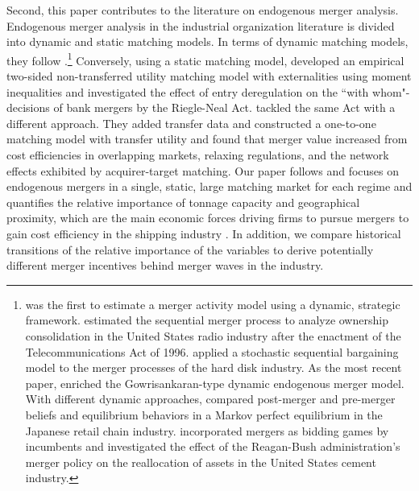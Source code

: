 \documentclass[10pt]{article}
\begin{document}
Second, this paper contributes to the literature on endogenous merger analysis. 
Endogenous merger analysis in the industrial organization literature is divided into dynamic and static matching models. 
In terms of dynamic matching models, they follow \cite{gowrisankaran1999dynamic}.\footnote{\cite{stahl2011dynamic} was the first to estimate a merger activity model using a dynamic, strategic framework. \cite{jeziorski2014effects} estimated the sequential merger process to analyze ownership consolidation in the United States radio industry after the enactment of the Telecommunications Act of 1996. \cite{igami2019mergers} applied a stochastic sequential bargaining model to the merger processes of the hard disk industry. As the most recent paper, \cite{hollenbeck2020horizontal} enriched the Gowrisankaran-type dynamic endogenous merger model. With different dynamic approaches, \cite{nishida2015better} compared post-merger and pre-merger beliefs and equilibrium behaviors in a Markov perfect equilibrium in the Japanese retail chain industry. \cite{perez2015building} incorporated mergers as bidding games by incumbents and investigated the effect of the Reagan-Bush administration's merger policy on the reallocation of assets in the United States cement industry.} Conversely, using a static matching model, \cite{uetake2019entry} developed an empirical two-sided non-transferred utility matching model with externalities using moment inequalities and investigated the effect of entry deregulation on the ``with whom"-decisions of bank mergers by the Riegle-Neal Act. 
\cite{akkus2015ms} tackled the same Act with a different approach. 
They added transfer data and constructed a one-to-one matching model with transfer utility and found that merger value increased from cost efficiencies in overlapping markets, relaxing regulations, and the network effects exhibited by acquirer-target matching. 
Our paper follows \cite{akkus2015ms} and focuses on endogenous mergers in a single, static, large matching market for each regime and quantifies the relative importance of tonnage capacity and geographical proximity, which are the main economic forces driving firms to pursue mergers to gain cost efficiency in the shipping industry \citep{notteboom2004container}. 
In addition, we compare historical transitions of the relative importance of the variables to derive potentially different merger incentives behind merger waves in the industry.
\end{document}
